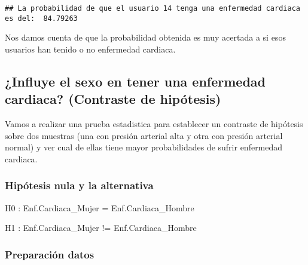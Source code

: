 \documentclass[
]{article}
\newenvironment{Shaded}{\begin{snugshade}}{\end{snugshade}}
\newcommand{\DecValTok}[1]{\textcolor[rgb]{0.86,0.86,0.80}{#1}}
\newcommand{\FunctionTok}[1]{\textcolor[rgb]{0.94,0.94,0.56}{#1}}
\newcommand{\NormalTok}[1]{\textcolor[rgb]{0.80,0.80,0.80}{#1}}
\newcommand{\OtherTok}[1]{\textcolor[rgb]{0.94,0.94,0.56}{#1}}
\newcommand{\SpecialCharTok}[1]{\textcolor[rgb]{0.86,0.64,0.64}{#1}}
\begin{document}
\begin{verbatim}
## La probabilidad de que el usuario 14 tenga una enfermedad cardiaca es del:  84.79263
\end{verbatim}

Nos damos cuenta de que la probabilidad obtenida es muy acertada a si
esos usuarios han tenido o no enfermedad cardiaca.

\hypertarget{influye-el-sexo-en-tener-una-enfermedad-cardiaca-contraste-de-hipuxf3tesis}{%
\subsection{¿Influye el sexo en tener una enfermedad cardiaca?
(Contraste de
hipótesis)}\label{influye-el-sexo-en-tener-una-enfermedad-cardiaca-contraste-de-hipuxf3tesis}}

Vamos a realizar una prueba estadistica para establecer un contraste de
hipótesis sobre dos muestras (una con presión arterial alta y otra con
presión arterial normal) y ver cual de ellas tiene mayor probabilidades
de sufrir enfermedad cardiaca.

\hypertarget{hipuxf3tesis-nula-y-la-alternativa}{%
\subsubsection{Hipótesis nula y la
alternativa}\label{hipuxf3tesis-nula-y-la-alternativa}}

H0 : Enf.Cardiaca\_Mujer = Enf.Cardiaca\_Hombre

H1 : Enf.Cardiaca\_Mujer != Enf.Cardiaca\_Hombre

\hypertarget{preparaciuxf3n-datos}{%
\subsubsection{Preparación datos}\label{preparaciuxf3n-datos}}

\begin{Shaded}
\end{Shaded}
\end{document}
